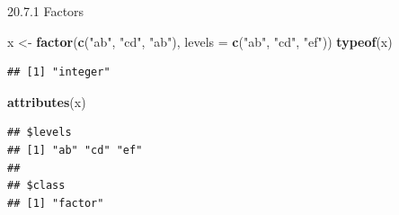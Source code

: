 \documentclass[ignorenonframetext,]{beamer}
\newenvironment{Shaded}{\begin{snugshade}}{\end{snugshade}}
\newcommand{\KeywordTok}[1]{\textcolor[rgb]{0.13,0.29,0.53}{\textbf{#1}}}
\newcommand{\DataTypeTok}[1]{\textcolor[rgb]{0.13,0.29,0.53}{#1}}
\newcommand{\StringTok}[1]{\textcolor[rgb]{0.31,0.60,0.02}{#1}}
\newcommand{\NormalTok}[1]{#1}
\begin{document}
\begin{frame}[fragile]{20.7.1 Factors}

\begin{Shaded}
\begin{Highlighting}[]
\NormalTok{x <-}\StringTok{ }\KeywordTok{factor}\NormalTok{(}\KeywordTok{c}\NormalTok{(}\StringTok{"ab"}\NormalTok{, }\StringTok{"cd"}\NormalTok{, }\StringTok{"ab"}\NormalTok{), }\DataTypeTok{levels =} \KeywordTok{c}\NormalTok{(}\StringTok{"ab"}\NormalTok{, }\StringTok{"cd"}\NormalTok{, }\StringTok{"ef"}\NormalTok{))}
\KeywordTok{typeof}\NormalTok{(x)}
\end{Highlighting}
\end{Shaded}

\begin{verbatim}
## [1] "integer"
\end{verbatim}

\begin{Shaded}
\begin{Highlighting}[]
\KeywordTok{attributes}\NormalTok{(x)}
\end{Highlighting}
\end{Shaded}

\begin{verbatim}
## $levels
## [1] "ab" "cd" "ef"
## 
## $class
## [1] "factor"
\end{verbatim}

\end{frame}
\end{document}
